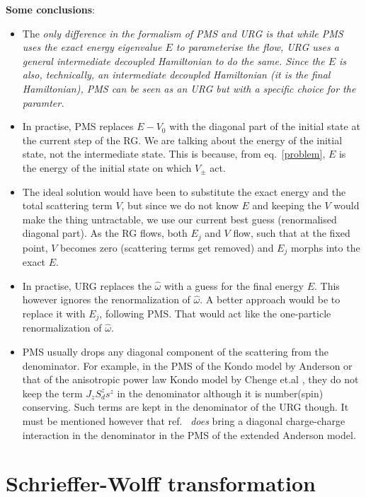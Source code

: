 \documentclass[12pt,twoside]{report}
\numberwithin{equation}{section}
\begin{document}
\pb \textbf{Some conclusions}:
\begin{itemize}
\item The \it{only} difference in the formalism of PMS and URG is that while PMS uses the exact energy eigenvalue \(E\) to parameterise the flow, URG uses a general intermediate decoupled Hamiltonian to do the same. Since the \(E\) is also, technically, an intermediate decoupled Hamiltonian (it is the final Hamiltonian), PMS can be seen as an URG but with a specific choice for the paramter.
\item In practise, PMS replaces \(E-V_0\) with the diagonal part of the initial state at the current step of the RG. We are talking about the energy of the initial state, not the intermediate state. This is because, from eq.~\ref{problem}, \(E\) is the energy of the initial state on which \(V_\pm\) act. 
\item The ideal solution would have been to substitute the exact energy and the total scattering term \(V\), but since we do not know \(E\) and keeping the \(V\) would make the thing untractable, we use our current best guess (renormalised diagonal part). As the RG flows, both \(E_j\) and \(V\) flow, such that at the fixed point, \(V\) becomes zero (scattering terms get removed) and \(E_j\) morphs into the exact \(E\). 
\item In practise, URG replaces the \(\hat \omega\) with a guess for the final energy \(E\). This however ignores the renormalization of \(\hat \omega\). A better approach would be to replace it with \(E_j\), following PMS. That would act like the one-particle renormalization of \(\hat \omega\).
\item PMS usually drops any diagonal component of the scattering from the denominator. For example, in the PMS of the Kondo model by Anderson \cite{Anderson} or that of the anisotropic power law Kondo model by Chenge et.al \cite{tatha}, they do not keep the term \(J_z S_d^z s^z\) in the denominator although it is number(spin) conserving. Such terms are kept in the denominator of the URG though. It must be mentioned however that ref.~\cite{raja} \textit{does} bring a diagonal charge-charge interaction in the denominator in the PMS of the extended Anderson model.
\end{itemize}
\section{Schrieffer-Wolff transformation}
\end{document}
